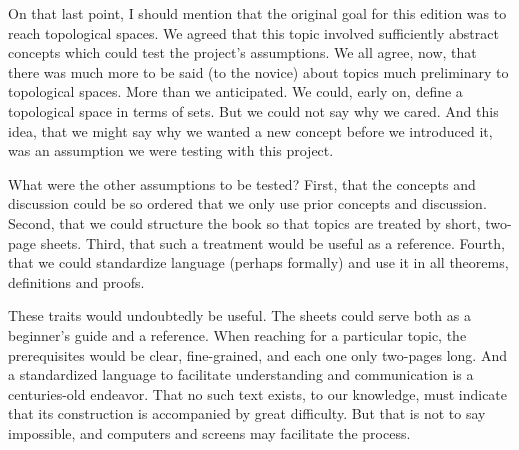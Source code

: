 On that last point, I should mention that the original goal for this edition was to reach topological spaces.
We agreed that this topic involved sufficiently abstract concepts which could test the project's assumptions.
We all agree, now, that there was much more to be said (to the novice) about topics much preliminary to topological spaces.
More than we anticipated.
We could, early on, define a topological space in terms of sets.
But we could not say why we cared.
And this idea, that we might say why we wanted a new concept before we introduced it, was an assumption we were testing with this project.

What were the other assumptions to be tested?
First, that the concepts and discussion could be so ordered that we only use prior concepts and discussion.
Second, that we could structure the book so that topics are treated by short, two-page sheets.
Third, that such a treatment would be useful as a reference.
Fourth, that we could standardize language (perhaps formally) and use it in all theorems, definitions and proofs.

These traits would undoubtedly be useful.
The sheets could serve both as a beginner's guide and a reference.
When reaching for a particular topic, the prerequisites would be clear, fine-grained, and each one only two-pages long.
And a standardized language to facilitate understanding and communication is a centuries-old endeavor.
That no such text exists, to our knowledge, must indicate that its construction is accompanied by great difficulty.
But that is not to say impossible, and computers and screens may facilitate the process.


